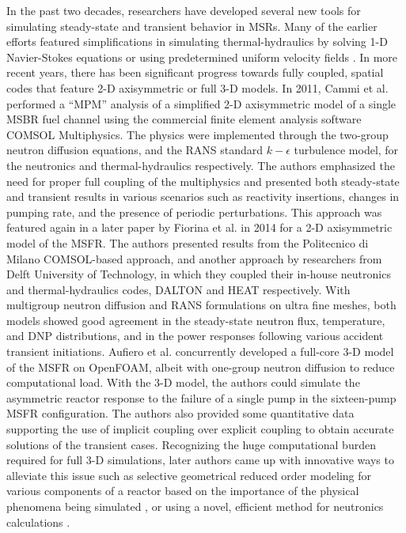 In the past two decades, researchers have developed several
new tools for simulating steady-state and transient behavior in \glspl{MSR}.
Many of the earlier efforts featured simplifications in simulating
thermal-hydraulics by solving 1-D Navier-Stokes equations or using
predetermined uniform velocity fields \cite{krepel_dyn3d-msr_2007}
\cite{kophazi_development_2009}. In more recent years, there has been
significant progress towards fully coupled, spatial codes that feature
2-D axisymmetric or full 3-D models. In 2011, Cammi et al.
\cite{cammi_multi-physics_2011} performed a ``\gls{MPM}'' analysis
of a simplified 2-D axisymmetric model of a single \gls{MSBR} fuel channel
using the commercial finite element analysis software COMSOL Multiphysics. The
physics were implemented through the two-group neutron diffusion
equations, and the \gls{RANS} standard $k-\epsilon$ turbulence model, for the
neutronics and thermal-hydraulics respectively. The
authors emphasized the need for proper full coupling of the multiphysics and
presented both steady-state and transient results in various
scenarios such as reactivity insertions, changes in pumping rate, and the
presence of periodic perturbations. This approach was featured again in a
later paper by Fiorina et al. \cite{fiorina_modelling_2014} in 2014 for a 2-D
axisymmetric model of the
\gls{MSFR}. The authors presented results from the Politecnico di Milano
COMSOL-based approach, and another approach by researchers from Delft
University of Technology, in which they coupled their in-house neutronics and
thermal-hydraulics codes, DALTON and HEAT respectively. With multigroup
neutron diffusion and \gls{RANS} formulations on ultra fine meshes, both
models showed good agreement in the steady-state neutron flux, temperature,
and \gls{DNP} distributions, and in the power responses following various
accident transient initiations. Aufiero et al. \cite{aufiero_development_2014}
concurrently developed
a full-core 3-D model of the \gls{MSFR} on OpenFOAM, albeit with one-group
neutron diffusion to reduce computational load. With the 3-D model, the
authors could simulate the asymmetric reactor response to the failure of a
single pump in the sixteen-pump \gls{MSFR} configuration. The authors also
provided some quantitative data supporting the use of implicit coupling over
explicit coupling to obtain accurate solutions of the transient cases.
Recognizing the huge computational burden required for full 3-D simulations, 
later authors came up with innovative ways to alleviate this issue such as
selective geometrical reduced order modeling for various components of a
reactor based on the importance of the physical phenomena being simulated
\cite{zanetti_geometric_2015}, or using a novel, efficient method for
neutronics calculations \cite{laureau_transient_2017}.

